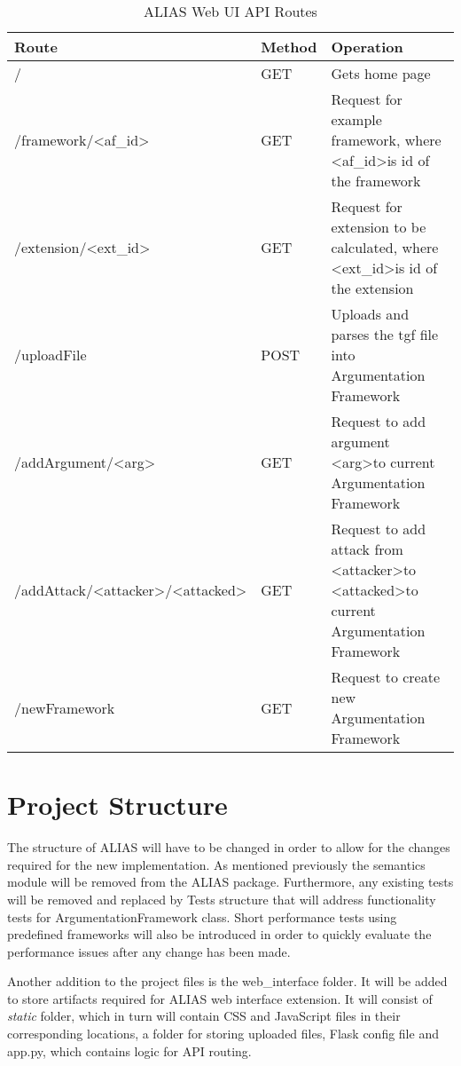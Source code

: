 \begin{table}[]
	\centering
		\begin{tabular}{|p{7cm}|p{1.5cm}|p{4.5cm}|}
			\hline
			\textbf{Route} & \textbf{Method} & \textbf{Operation}  \\ \hline \hline
			/ & GET & Gets home page \\ \hline
			/framework/\textless{}af\_id\textgreater{} & GET & Request for example framework, where \textless{}af\_id\textgreater is id of the framework \\ \hline
			/extension/\textless{}ext\_id\textgreater{} & GET & Request for extension to be calculated, where \textless{}ext\_id\textgreater is id of the extension \\ \hline
			/uploadFile & POST & Uploads and parses the tgf file into Argumentation Framework \\ \hline
			/addArgument/\textless{}arg\textgreater{} & GET & Request to add argument \textless{}arg\textgreater to current Argumentation Framework \\ \hline
			/addAttack/\textless{}attacker\textgreater{}/\textless{}attacked\textgreater{} & GET & Request to add attack from \textless{}attacker\textgreater to \textless{}attacked\textgreater to current Argumentation Framework \\ \hline
			/newFramework & GET & Request to create new Argumentation Framework \\ \hline
		\end{tabular}%
	\caption{ALIAS Web UI API Routes}
	\label{table:apiRoutes}
\end{table}

\section{Project Structure}
The structure of ALIAS will have to be changed in order to allow for the changes required for the new implementation. As mentioned previously the semantics module will be removed from the ALIAS package. Furthermore, any existing tests will be removed and replaced by Tests structure that will address functionality tests for ArgumentationFramework class. Short performance tests using predefined frameworks will also be introduced in order to quickly evaluate the performance issues after any change has been made.

Another addition to the project files is the web\_interface folder. It will be added to store artifacts required for ALIAS web interface extension. It will consist of \textit{static} folder, which in turn will contain CSS and JavaScript files in their corresponding locations, a folder for storing uploaded files, Flask config file and app.py, which contains logic for API routing.

